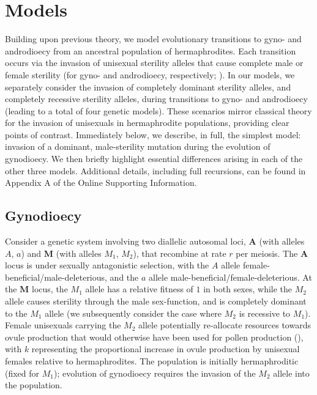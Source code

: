 \documentclass{article}
\begin{document}
\section*{Models} \label{sec:Models}

Building upon previous theory, we model evolutionary transitions to gyno- and androdioecy from an ancestral population of hermaphrodites. Each transition occurs via the invasion of unisexual sterility alleles that cause complete male or female sterility (for gyno- and androdioecy, respectively; \citealt{Charlesworth1978a}). In our models, we separately consider the invasion of completely dominant sterility alleles, and completely recessive sterility alleles, during transitions to gyno- and androdioecy (leading to a total of four genetic models). These scenarios mirror classical theory for the invasion of unisexuals in hermaphrodite populations, providing clear points of contrast. Immediately below, we describe, in full, the simplest model: invasion of a dominant, male-sterility mutation during the evolution of gynodioecy. We then briefly highlight essential differences arising in each of the other three models. Additional details, including full recursions, can be found in Appendix A of the Online Supporting Information.

\subsection*{Gynodioecy}

Consider a genetic system involving two diallelic autosomal loci, $\mathbf{A}$ (with alleles $A$, $a$) and $\mathbf{M}$ (with alleles $M_1$, $M_2$), that recombine at rate $r$ per meiosis. The $\mathbf{A}$ locus is under sexually antagonistic selection, with the $A$ allele female-beneficial/male-deleterious, and the $a$ allele male-beneficial/female-deleterious. At the $\mathbf{M}$ locus, the $M_1$ allele has a relative fitness of $1$ in both sexes, while the $M_2$ allele causes sterility through the male sex-function, and is completely dominant to the $M_1$ allele (we subsequently consider the case where $M_2$ is recessive to $M_1$). Female unisexuals carrying the $M_2$ allele potentially re-allocate resources towards ovule production that would otherwise have been used for pollen production (\citealt{Lloyd1975,Lloyd1976,Charlesworth1978a}), with $k$ representing the proportional increase in ovule production by unisexual females relative to hermaphrodites. The population is initially hermaphroditic (fixed for $M_1$); evolution of gynodioecy requires the invasion of the $M_2$ allele into the population.
\end{document}

